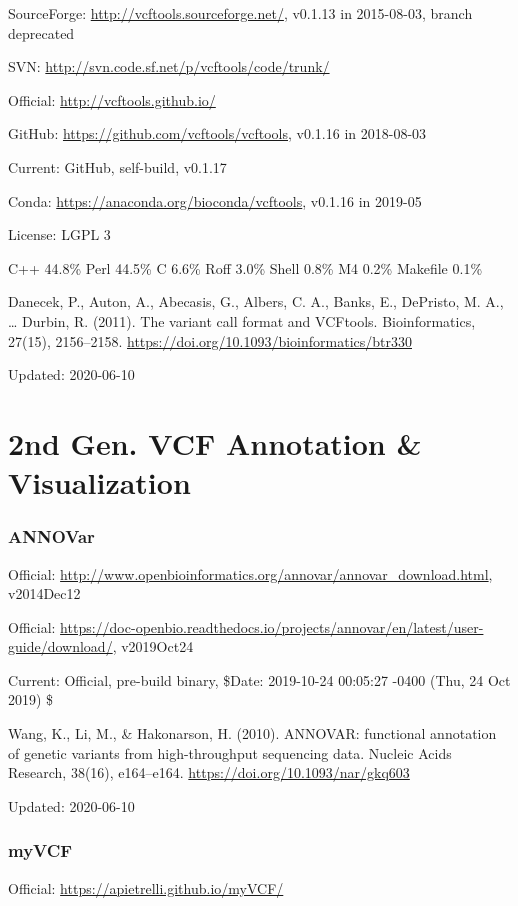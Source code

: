 \documentclass[]{article}
\begin{document}
SourceForge: \url{http://vcftools.sourceforge.net/}, v0.1.13 in 2015-08-03, branch deprecated

SVN: \url{http://svn.code.sf.net/p/vcftools/code/trunk/}

Official: \url{http://vcftools.github.io/}

GitHub: \url{https://github.com/vcftools/vcftools}, v0.1.16 in 2018-08-03

Current: GitHub, self-build, v0.1.17

Conda: \url{https://anaconda.org/bioconda/vcftools}, v0.1.16 in 2019-05

License: LGPL 3

C++ 44.8\% Perl 44.5\% C 6.6\% Roff 3.0\% Shell 0.8\% M4 0.2\% Makefile 0.1\%

Danecek, P., Auton, A., Abecasis, G., Albers, C. A., Banks, E., DePristo, M. A., … Durbin, R. (2011). The variant call format and VCFtools. Bioinformatics, 27(15), 2156–2158. \url{https://doi.org/10.1093/bioinformatics/btr330}

Updated: 2020-06-10

\part{2nd Gen. VCF Annotation \& Visualization}
\section{ANNOVar}

Official: \url{http://www.openbioinformatics.org/annovar/annovar_download.html}, v2014Dec12

Official: \url{https://doc-openbio.readthedocs.io/projects/annovar/en/latest/user-guide/download/}, v2019Oct24

Current: Official, pre-build binary, \$Date: 2019-10-24 00:05:27 -0400 (Thu, 24 Oct 2019) \$

Wang, K., Li, M., \& Hakonarson, H. (2010). ANNOVAR: functional annotation of genetic variants from high-throughput sequencing data. Nucleic Acids Research, 38(16), e164–e164. \url{https://doi.org/10.1093/nar/gkq603}


Updated: 2020-06-10

\section{myVCF}

Official: \url{https://apietrelli.github.io/myVCF/}
\end{document}
